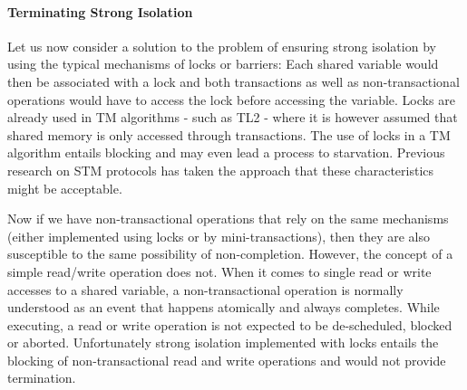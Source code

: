 \paragraph{Terminating Strong  Isolation}


Let us now consider a solution to  the problem of  ensuring strong isolation 
by using the typical mechanisms of locks or barriers: Each shared
variable would then  
be associated with a lock and both transactions as well as non-transactional 
operations would have to access the lock before accessing the variable.
Locks are already used  in TM algorithms - such as TL2 \cite{DSS06} - where it is
however     assumed   that  shared   memory   is   only  accessed   through
transactions. The use  of locks  in a TM algorithm  entails blocking and may
even lead a process to starvation.
Previous research on STM protocols has taken the approach that
these characteristics might be acceptable.

Now if we have non-transactional operations that rely on the same mechanisms
(either implemented using locks or by mini-transactions), then they are also susceptible
to the same possibility of non-completion.
However, the concept of a simple read/write operation does not.
When it  comes to single read or  write accesses  to  a shared
variable, a  non-transactional operation is normally understood  as an
event  that  happens   atomically  and always  completes.
While executing, a  read  or write  operation   is  not 
expected  to  be de-scheduled, blocked or aborted.  
Unfortunately   strong
isolation  implemented with  locks  entails the blocking  
of non-transactional read and write operations and would not provide termination.

